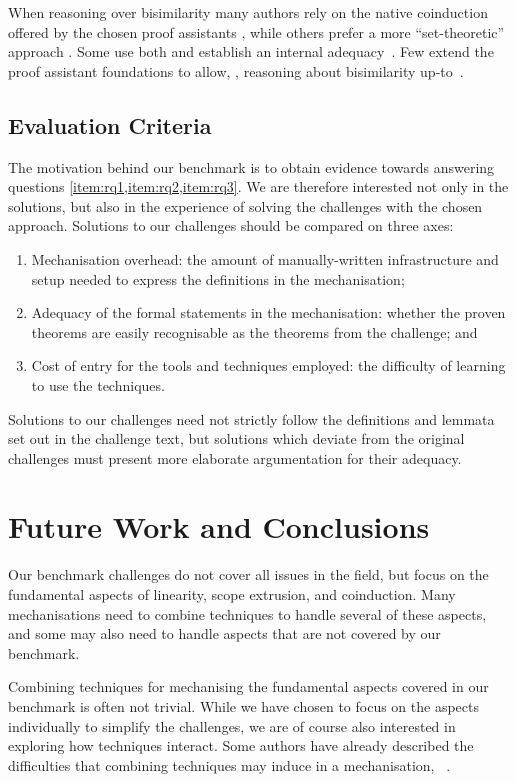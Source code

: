 \documentclass[runningheads]{llncs}
\begin{document}
When reasoning over bisimilarity many authors rely on the native
 coinduction offered by the chosen proof assistants
\cite{Bengtson2016,Kahsai2008,Thiemann2019,Gay2020}, while others prefer a
more ``set-theoretic'' approach
\cite{Hirschkoff1997,Bengtson2009,Maksimovic2015,Pohjola2022}. Some
use both and establish an internal adequacy~\cite{Honsell2001}. Few
extend the proof assistant foundations to allow, \eg, reasoning about
bisimilarity up-to~\cite{ChaudhuriCM15}.

\subsection{Evaluation Criteria}
The motivation behind our benchmark is to obtain evidence towards answering
questions \cref{item:rq1,item:rq2,item:rq3}. We are therefore
interested not only in the solutions, but also in the experience of
solving the challenges with the chosen approach.  Solutions to our
challenges should be compared on three axes:
\begin{enumerate}
\item Mechanisation overhead: the amount of manually-written infrastructure and setup needed to express the definitions in the mechanisation;
\item Adequacy of the formal statements in the mechanisation: whether the proven theorems are easily recognisable as the theorems from the challenge; and
\item Cost of entry for the tools and techniques employed: the difficulty of learning to use the techniques.
\end{enumerate}
Solutions to our challenges need not strictly follow the definitions and lemmata set out in the challenge text, but solutions which deviate from the original challenges must present more elaborate argumentation for their adequacy.

\section{Future Work and Conclusions}\label{sec:going-beyond}
Our benchmark challenges do not cover all issues in the field, but focus on the fundamental aspects of linearity, scope extrusion, and coinduction.
Many mechanisations need to combine techniques to handle several of these aspects, and some may also need to handle aspects that are not covered by our benchmark.

Combining techniques for mechanising the fundamental aspects covered in our benchmark is often not trivial.
While we have chosen to focus on the aspects individually to simplify the challenges, we are of course also interested in exploring how techniques interact.
Some authors have already described the difficulties that combining techniques may induce in a mechanisation, \eg~\cite{DBLP:conf/forte/ZalakainD21}.
\end{document}
